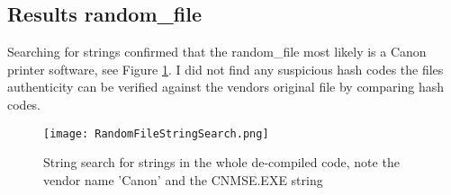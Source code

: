 \documentclass[
	letterpaper, %
	10pt, %
	unnumberedsections, %
	twoside, %
]{APAAssignment}
\begin{document}
\subsection{Results random\_file}
Searching for strings confirmed that the random\_file most likely is a Canon printer software, see Figure \ref{fig:GhidraRandomFileString}. I did not find any suspicious hash codes the files authenticity can be verified against the vendors original file by comparing hash codes.

\begin{figure}[!htp] %
	\centering
	\texttt{[image: RandomFileStringSearch.png]}
	\caption{String search for strings in the whole de-compiled code, note the vendor name 'Canon' and the CNMSE.EXE string}
	\label{fig:GhidraRandomFileString}
\end{figure}





\clearpage
\printbibliography %





\appendix


\clearpage
\end{document}

